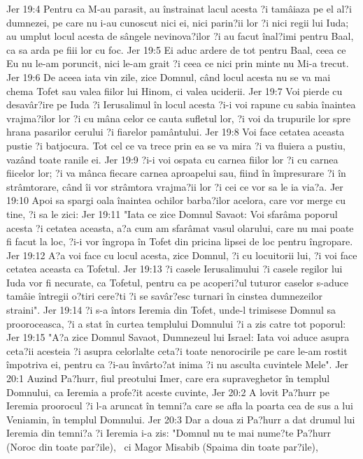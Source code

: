 Jer 19:4  Pentru ca M-au parasit, au înstrainat lacul acesta ?i tamâiaza pe el al?i dumnezei, pe care nu i-au cunoscut nici ei, nici parin?ii lor ?i nici regii lui Iuda; au umplut locul acesta de sângele nevinova?ilor ?i au facut înal?imi pentru Baal, ca sa arda pe fiii lor cu foc.
Jer 19:5  Ei aduc ardere de tot pentru Baal, ceea ce Eu nu le-am poruncit, nici le-am grait ?i ceea ce nici prin minte nu Mi-a trecut.
Jer 19:6  De aceea iata vin zile, zice Domnul, când locul acesta nu se va mai chema Tofet sau valea fiilor lui Hinom, ci valea uciderii.
Jer 19:7  Voi pierde cu desavâr?ire pe Iuda ?i Ierusalimul în locul acesta ?i-i voi rapune cu sabia înaintea vrajma?ilor lor ?i cu mâna celor ce cauta sufletul lor, ?i voi da trupurile lor spre hrana pasarilor cerului ?i fiarelor pamântului.
Jer 19:8  Voi face cetatea aceasta pustie ?i batjocura. Tot cel ce va trece prin ea se va mira ?i va fluiera a pustiu, vazând toate ranile ei.
Jer 19:9  ?i-i voi ospata cu carnea fiilor lor ?i cu carnea fiicelor lor; ?i va mânca fiecare carnea aproapelui sau, fiind în împresurare ?i în strâmtorare, când îi vor strâmtora vrajma?ii lor ?i cei ce vor sa le ia via?a.
Jer 19:10  Apoi sa spargi oala înaintea ochilor barba?ilor acelora, care vor merge cu tine, ?i sa le zici:
Jer 19:11  "Iata ce zice Domnul Savaot: Voi sfarâma poporul acesta ?i cetatea aceasta, a?a cum am sfarâmat vasul olarului, care nu mai poate fi facut la loc, ?i-i vor îngropa în Tofet din pricina lipsei de loc pentru îngropare.
Jer 19:12  A?a voi face cu locul acesta, zice Domnul, ?i cu locuitorii lui, ?i voi face cetatea aceasta ca Tofetul.
Jer 19:13  ?i casele Ierusalimului ?i casele regilor lui Iuda vor fi necurate, ca Tofetul, pentru ca pe acoperi?ul tuturor caselor s-aduce tamâie întregii o?tiri cere?ti ?i se savâr?esc turnari în cinstea dumnezeilor straini".
Jer 19:14  ?i s-a întors Ieremia din Tofet, unde-l trimisese Domnul sa prooroceasca, ?i a stat în curtea templului Domnului ?i a zis catre tot poporul:
Jer 19:15  "A?a zice Domnul Savaot, Dumnezeul lui Israel: Iata voi aduce asupra ceta?ii acesteia ?i asupra celorlalte ceta?i toate nenorocirile pe care le-am rostit împotriva ei, pentru ca ?i-au învârto?at inima ?i nu asculta cuvintele Mele".
Jer 20:1  Auzind Pa?hurr, fiul preotului Imer, care era supraveghetor în templul Domnului, ca Ieremia a profe?it aceste cuvinte,
Jer 20:2  A lovit Pa?hurr pe Ieremia proorocul ?i l-a aruncat în temni?a care se afla la poarta cea de sus a lui Veniamin, în templul Domnului.
Jer 20:3  Dar a doua zi Pa?hurr a dat drumul lui Ieremia din temni?a ?i Ieremia i-a zis: "Domnul nu te mai nume?te Pa?hurr (Noroc din toate par?ile),  ci Magor Misabib (Spaima din toate par?ile),
